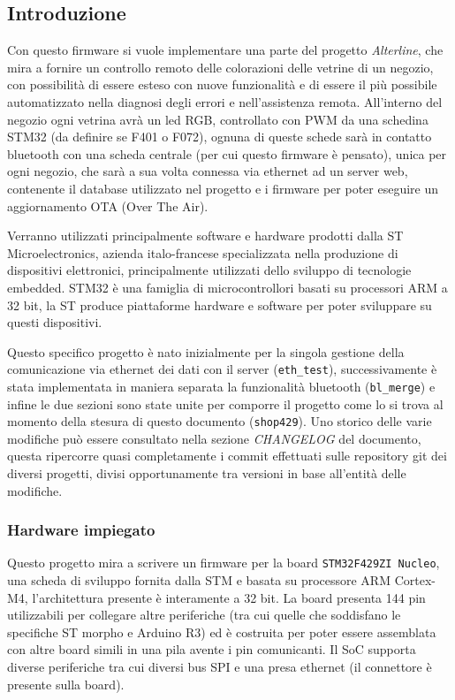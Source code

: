 \subsection{Introduzione}

Con questo firmware si vuole implementare una parte del progetto \textit{Alterline}, che mira a fornire un controllo remoto delle colorazioni delle vetrine di un negozio, con possibilit\`a di essere esteso con nuove funzionalit\`a e di essere il pi\`u possibile automatizzato nella diagnosi degli errori e nell'assistenza remota. All'interno del negozio ogni vetrina avr\`a un led RGB, controllato con PWM da una schedina STM32 (da definire se F401 o F072), ognuna di queste schede sar\`a in contatto bluetooth con una scheda centrale (per cui questo firmware \`e pensato), unica per ogni negozio, che sar\`a a sua volta connessa via ethernet ad un server web, contenente il database utilizzato nel progetto e i firmware per poter eseguire un aggiornamento OTA (Over The Air).

Verranno utilizzati principalmente software e hardware prodotti dalla ST Microelectronics, azienda italo-francese specializzata nella produzione di dispositivi elettronici, principalmente utilizzati dello sviluppo di tecnologie embedded. STM32 \`e una famiglia di microcontrollori basati su processori ARM a 32 bit, la ST produce piattaforme hardware e software per poter sviluppare su questi dispositivi.

Questo specifico progetto \`e nato inizialmente per la singola gestione della comunicazione via ethernet dei dati con il server (\texttt{eth\_test}), successivamente \`e stata implementata in maniera separata la funzionalit\`a bluetooth (\texttt{bl\_merge}) e infine le due sezioni sono state unite per comporre il progetto come lo si trova al momento della stesura di questo documento (\texttt{shop429}). Uno storico delle varie modifiche pu\`o essere consultato nella sezione \textit{CHANGELOG} del documento, questa ripercorre quasi completamente i commit effettuati sulle repository git dei diversi progetti, divisi opportunamente tra versioni in base all'entit\`a delle modifiche.

\subsubsection{Hardware impiegato}


Questo progetto mira a scrivere un firmware per la board \texttt{STM32F429ZI Nucleo}, una scheda di sviluppo fornita dalla STM e basata su processore ARM Cortex-M4, l'architettura presente \`e interamente a 32 bit. La board presenta 144 pin utilizzabili per collegare altre periferiche (tra cui quelle che soddisfano le specifiche ST morpho e Arduino R3) ed \`e costruita per poter essere assemblata con altre board simili in una pila avente i pin comunicanti. Il SoC supporta diverse periferiche tra cui diversi bus SPI e una presa ethernet (il connettore \`e presente sulla board).

